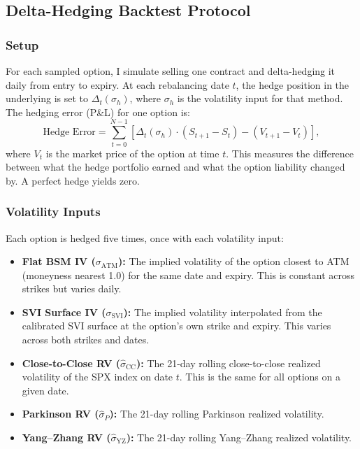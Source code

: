 \documentclass[12pt, letterpaper]{article}
\begin{document}
\subsection{Delta-Hedging Backtest Protocol}
\label{sec:hedging_protocol}

\subsubsection{Setup}

For each sampled option, I simulate selling one contract and delta-hedging it daily from entry to expiry. At each rebalancing date $t$, the hedge position in the underlying is set to $\Delta_t(\sigma_h)$, where $\sigma_h$ is the volatility input for that method. The hedging error (P\&L) for one option is:
\begin{equation}
    \text{Hedge Error} = \sum_{t=0}^{N-1} \left[\Delta_t(\sigma_h) \cdot (S_{t+1} - S_t) - (V_{t+1} - V_t)\right],
    \label{eq:hedge_error}
\end{equation}
where $V_t$ is the market price of the option at time $t$. This measures the difference between what the hedge portfolio earned and what the option liability changed by. A perfect hedge yields zero.

\subsubsection{Volatility Inputs}

Each option is hedged five times, once with each volatility input:

\begin{itemize}
    \item \textbf{Flat BSM IV ($\sigma_{\text{ATM}}$):} The implied volatility of the option closest to ATM (moneyness nearest 1.0) for the same date and expiry. This is constant across strikes but varies daily.
    \item \textbf{SVI Surface IV ($\sigma_{\text{SVI}}$):} The implied volatility interpolated from the calibrated SVI surface at the option's own strike and expiry. This varies across both strikes and dates.
    \item \textbf{Close-to-Close RV ($\hat{\sigma}_{\text{CC}}$):} The 21-day rolling close-to-close realized volatility of the SPX index on date $t$. This is the same for all options on a given date.
    \item \textbf{Parkinson RV ($\hat{\sigma}_P$):} The 21-day rolling Parkinson realized volatility.
    \item \textbf{Yang--Zhang RV ($\hat{\sigma}_{\text{YZ}}$):} The 21-day rolling Yang--Zhang realized volatility.
\end{itemize}
\end{document}
